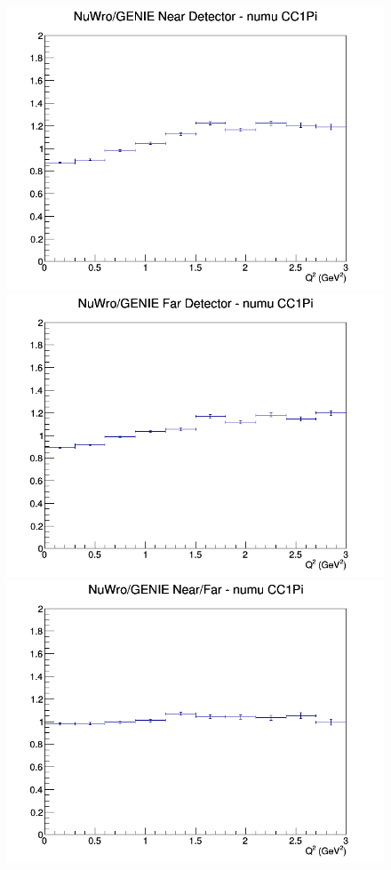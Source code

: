 \documentclass[12pt]{article}
\begin{document}
\begin{figure}[h]
\endminipage
\newline
{}
\includegraphics[width=\linewidth]{Q2/nominal/ratios/CC1Pi_NuWro_GENIE_numu_near_Q2.png}
\endminipage
{}
\includegraphics[width=\linewidth]{Q2/nominal/ratios/CC1Pi_NuWro_GENIE_numu_far_Q2.png}
\endminipage
{}
\includegraphics[width=\linewidth]{Q2/nominal/ratios/CC1Pi_NuWro_GENIE_numu_NF_Q2.png}
\endminipage
\newline
\end{figure}
\clearpage
\end{document}
